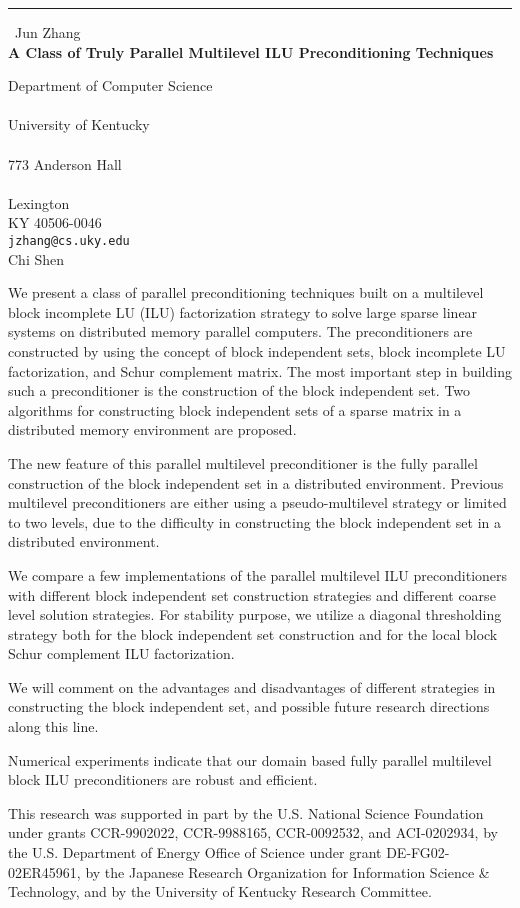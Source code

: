 \documentclass{report}
\begin{document}
\begin{center}
\rule{6in}{1pt} \
{\large Jun Zhang \\
{\bf A Class of Truly Parallel Multilevel ILU Preconditioning Techniques}}

Department of Computer Science \\ \\ University of Kentucky \\ \\ 773 Anderson Hall \\ \\ Lexington \\ KY 40506-0046
\\
{\tt jzhang@cs.uky.edu}\\
Chi Shen\end{center}

We present a class of parallel preconditioning techniques built on
a multilevel block incomplete LU (ILU) factorization strategy to
solve large sparse linear systems on distributed memory parallel
computers. The preconditioners are constructed by using the concept
of block independent sets, block incomplete LU factorization,
and Schur complement matrix. The most important step in building
such a preconditioner is the construction of the
block independent set. Two algorithms for constructing
block independent sets of a sparse matrix in a distributed
memory environment are proposed.

The new feature of this parallel multilevel preconditioner
is the fully parallel construction of the block independent
set in a distributed environment. Previous multilevel
preconditioners are either using a pseudo-multilevel
strategy or limited to two levels, due to the difficulty
in constructing the block independent set in a distributed
environment.

We compare a few implementations of the parallel multilevel ILU
preconditioners with different block independent set construction
strategies and different coarse level solution strategies.
For stability purpose, we utilize a diagonal thresholding strategy
both for the block independent set construction
and for the local block Schur complement ILU factorization.

We will comment on the advantages and disadvantages of
different strategies in constructing the block independent
set, and possible future research directions along this
line.

Numerical experiments indicate that our domain based
fully parallel multilevel block ILU preconditioners
are robust and efficient.

This research was supported in part by the U.S.
National Science Foundation under grants CCR-9902022,
CCR-9988165, CCR-0092532, and ACI-0202934, by
the U.S. Department of Energy Office of Science under
grant DE-FG02-02ER45961, by the
Japanese Research Organization for Information Science
\& Technology, and by the University of Kentucky
Research Committee.
\end{document}
